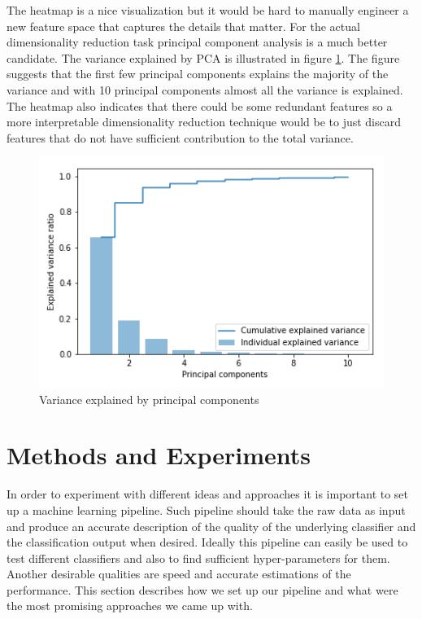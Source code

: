 \documentclass[fleqn,10pt]{SelfArx} %
\begin{document}
The heatmap is a nice visualization but it would be hard to manually engineer a
new feature space that captures the details that matter. For the actual
dimensionality reduction task principal component analysis is a much better
candidate.
The variance explained by PCA is illustrated in figure \ref{fig:pca}. The figure
suggests that the first few principal components explains the majority of the
variance and with 10 principal components almost all the variance is explained.
The heatmap also indicates that there could be some redundant
features so a more interpretable dimensionality reduction technique would be to
just discard features that do not have sufficient contribution to the total variance.

\begin{figure}[H]
  \includegraphics[width=\linewidth]{pca.png}
  \caption{Variance explained by principal components}
  \label{fig:pca}
\end{figure}

\section{Methods and Experiments} %

In order to experiment with different ideas and approaches it is important to
set up a machine learning pipeline. Such pipeline should take the raw data as input and produce
an accurate description of the quality of the underlying classifier and the
classification output when desired. Ideally this pipeline can easily be used to
test different classifiers and also to find sufficient hyper-parameters for them.
Another desirable qualities are speed and accurate estimations of the
performance. This section describes how we set up our pipeline and what were the
most promising approaches we came up with.
\end{document}
